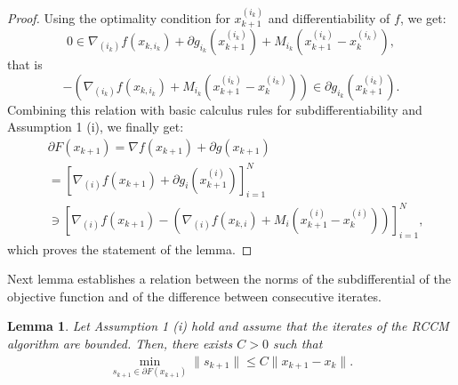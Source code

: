 \documentclass[lettersize,journal]{IEEEtran}
\newtheorem{lem}{Lemma}
\begin{document}
\begin{proof}
Using the optimality condition for $x_{k+1}^{(i_{k})}$ and differentiability of $f$, we get:
\[  0 \in  \nabla_{(i_k)} f(x_{k,i_k}) + \partial g_{i_k} ( x_{k+1}^{(i_{k})}) + \! M_{i_k} \!\left(x_{k+1}^{(i_k)} \!- x_k^{(i_k)}\right),  \]
that is
\[  - \left(  \nabla_{(i_k)} f(x_{k,i_k}) + M_{i_k} \!\left(x_{k+1}^{(i_k)} \!- x_k^{(i_k)}\right) \right) \in  \partial g_{i_k} ( x_{k+1}^{(i_{k})}). \] 
Combining this relation with  basic calculus rules for subdifferentiability and  Assumption 1 (i), we finally get:
\begin{align*}
& \partial F(x_{k+1})  = \nabla f(x_{k+1}) +  \partial g(x_{k+1}) \\
& = \left[ \nabla_{(i)} f(x_{k+1}) +  \partial g_i(x_{k+1}^{(i)}) \right ]_{i=1}^N \\
& \ni \left[ \nabla_{(i)} f(x_{k+1}) - \left(  \nabla_{(i)} f(x_{k,i}) + M_{i} \!\left(x_{k+1}^{(i)} \!- x_k^{(i)}\right) \right)  \right ]_{i=1}^N, 
\end{align*}
which proves the statement of the lemma. 
\end{proof}

\noindent Next lemma establishes a relation between the norms of the  subdifferential of the objective function and of the difference between consecutive iterates.  
\begin{lem}
		\label{lemma:3}
Let Assumption 1 (i) hold and assume that the iterates of the RCCM algorithm  are bounded.  Then, there exists $C>0$ such that 
		\begin{align*}
			\min_{s_{k+1} \in \partial F(x_{k+1})} \|s_{k+1}\| \leq C \|x_{k+1} - x_{k}\|.   
		\end{align*} 
\end{lem}	
\end{document}
